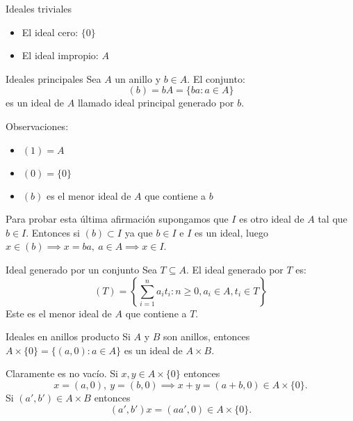 \begin{example}{Ideales triviales}{}
    \begin{itemize}
        \item El {ideal cero}: \(\{0\}\)
        \item El {ideal impropio}: \(A\)
    \end{itemize}
\end{example}

\begin{example}{Ideales principales}{}
    Sea \(A\) un anillo y \(b \in A\). El conjunto:
    \[
    (b) = bA = \{ba : a \in A\}
    \]
    es un ideal de \(A\) llamado {ideal principal generado por \(b\)}.
    
    Observaciones:
    \begin{itemize}
        \item \((1) = A\)
        \item \((0) = \{0\}\)
        \item \((b)\) es el menor ideal de \(A\) que contiene a \(b\)
    \end{itemize}
\end{example}

Para probar esta última afirmación supongamos que $I$ es otro ideal de $A$ tal que $b \in I$. Entonces si $(b) \subset I$ ya que $b \in I$ e $I$ es un ideal, luego $x \in (b) \implies x = ba,\ a \in A \implies x \in I$.

\clearpage

\begin{example}{Ideal generado por un conjunto}{}
    Sea \(T \subseteq A\). El {ideal generado por \(T\)} es:
    \[
    (T) = \left\{\sum_{i=1}^n a_i t_i : n \geq 0, a_i \in A, t_i \in T\right\}
    \]
    Este es el menor ideal de \(A\) que contiene a \(T\).
\end{example}

\begin{example}{Ideales en anillos producto}{}
    Si \(A\) y \(B\) son anillos, entonces \(A \times \{0\} = \{(a, 0) : a \in A\}\) es un ideal de \(A \times B\).
\end{example}

\begin{proofbox}
    Claramente es no vacío. Si $x,y \in A \times \{0\}$ entonces 
    \[
    x = (a,0),\ y = (b,0) \implies x + y = (a+b, 0) \in A \times \{0\}.
    \]
    Si $(a',b') \in A \times B$ entonces 
    \[
    (a',b')x = (aa',0) \in A \times \{0\}.
    \]
\end{proofbox}

